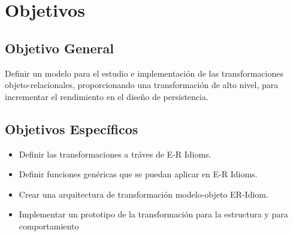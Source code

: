 \section {Objetivos}
\subsection{Objetivo General}
\noindent Definir un modelo para el estudio e implementación de las transformaciones objeto-relacionales,
\noindent proporcionando una transformación de alto nivel, para incrementar el rendimiento en el diseño de persistencia.
\subsection{Objetivos Específicos}
\begin{itemize}
    \item Definir las transformaciones a tráves de E-R Idioms.
    \item Definir funciones genéricas que se puedan aplicar en E-R Idioms.
    \item Crear una arquitectura de transformación modelo-objeto ER-Idiom.
    \item Implementar un prototipo de la transformación para la estructura y para comportamiento
\end{itemize}
